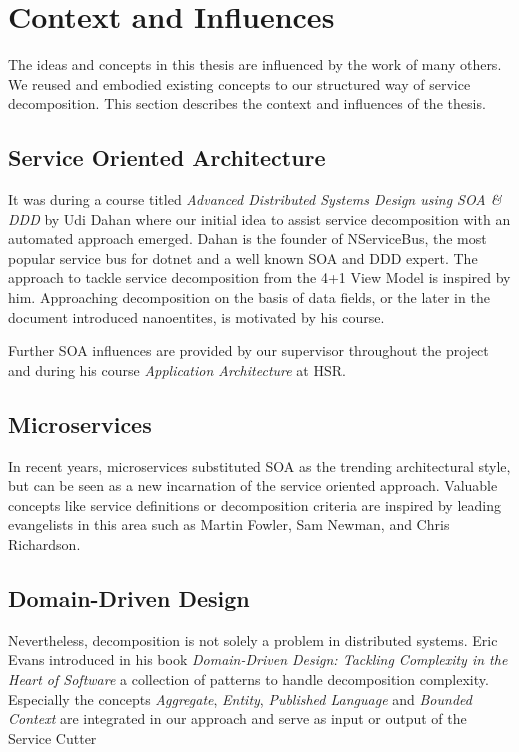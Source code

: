 \section{Context and Influences}

The ideas and concepts in this thesis are influenced by the work of many others. We reused and embodied existing concepts to our structured way of service decomposition. This section describes the context and influences of the thesis.

\subsection{Service Oriented Architecture}

It was during a course titled \textit{Advanced Distributed Systems Design using SOA \& DDD} by Udi Dahan where our initial idea to assist service decomposition with an automated approach emerged. Dahan is the founder of NServiceBus\cite{nservicebus}, the most popular service bus for \gls{dotnet} and a well known \gls{SOA} and \gls{DDD} expert. The approach to tackle service decomposition from the 4+1 View Model\cite{fourPlusOne} is inspired by him. Approaching decomposition on the basis of data fields, or the later in the document introduced nanoentites, is motivated by his course.

Further \gls{SOA} influences are provided by our supervisor throughout the project and during his course \textit{Application Architecture} at \gls{HSR}.

\subsection{Microservices}

In recent years, microservices substituted \gls{SOA} as the trending architectural style, but can be seen as a new incarnation of the service oriented approach. Valuable concepts like service definitions or decomposition criteria are inspired by leading evangelists in this area such as Martin Fowler, Sam Newman, and Chris Richardson. 

\subsection{Domain-Driven Design}

Nevertheless, decomposition is not solely a problem in distributed systems. Eric Evans introduced in his book \textit{Domain-Driven Design: Tackling Complexity in the Heart of Software}\cite{evans2003domain} a collection of patterns to handle decomposition complexity. Especially the concepts \textit{Aggregate}, \textit{Entity}, \textit{Published Language} and \textit{Bounded Context} are integrated in our approach and serve as input or output of the Service Cutter

